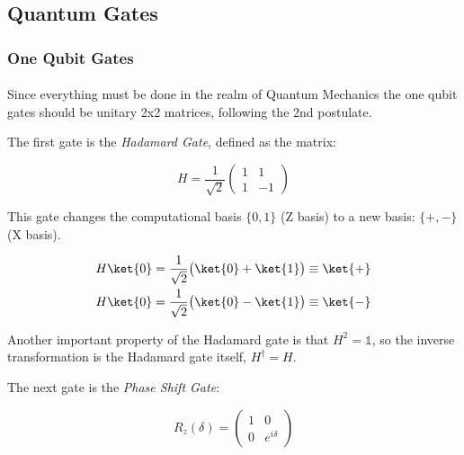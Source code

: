 \subsection{Quantum Gates}
\label{subsec: Quantum Gates}

\subsubsection{One Qubit Gates}
\label{Subsubsec: One Qubit Gates}

\paragraph{}Since everything must be done in the realm of Quantum Mechanics the one qubit gates should be unitary 2x2 matrices, following the 2nd postulate.

The first gate is the \textit{Hadamard Gate}, defined as the matrix:

\begin{equation}
    H = \frac{1}{\sqrt{2}} \begin{pmatrix}
    1 & 1 \\
    1 & -1
    \end{pmatrix}
\end{equation}

This gate changes the computational basis $\{0,1 \}$ (Z basis) to a new basis: $\{ +,- \}$ (X basis).

\begin{equation}
    \begin{split}
        H \ket{0} = \frac{1}{\sqrt{2}} \big( \ket{0} + \ket{1} \big)  \equiv \ket{+} \\
        H \ket{0} = \frac{1}{\sqrt{2}} \big( \ket{0} - \ket{1} \big)  \equiv \ket{-}
    \end{split}
\end{equation}

Another important property of the Hadamard gate is that $H^2 = \mathds{1}$, so the inverse transformation is the Hadamard gate itself, $H^{\dagger} = H$.

The next gate is the \textit{Phase Shift Gate}:

\begin{equation}
R_z (\delta) = \begin{pmatrix}
1 & 0 \\
0 & e^{i \delta}
\end{pmatrix}
\end{equation}

